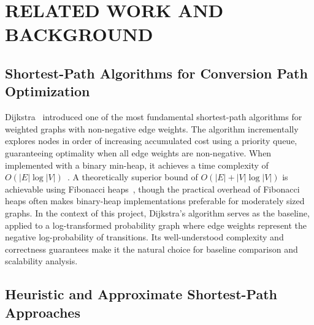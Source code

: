\chapter{RELATED WORK AND BACKGROUND}

\section{Shortest-Path Algorithms for Conversion Path Optimization}

Dijkstra~\citep{dijkstra1959} introduced one of the most fundamental shortest-path algorithms for weighted graphs with non-negative edge weights. The algorithm incrementally explores nodes in order of increasing accumulated cost using a priority queue, guaranteeing optimality when all edge weights are non-negative. When implemented with a binary min-heap, it achieves a time complexity of $O(|E|\log|V|)$~\citep{cormen2009}. A theoretically superior bound of $O(|E| + |V|\log|V|)$ is achievable using Fibonacci heaps~\citep{fredman1987fibonacci}, though the practical overhead of Fibonacci heaps often makes binary-heap implementations preferable for moderately sized graphs. In the context of this project, Dijkstra's algorithm serves as the baseline, applied to a log-transformed probability graph where edge weights represent the negative log-probability of transitions. Its well-understood complexity and correctness guarantees make it the natural choice for baseline comparison and scalability analysis.

\section{Heuristic and Approximate Shortest-Path Approaches}

